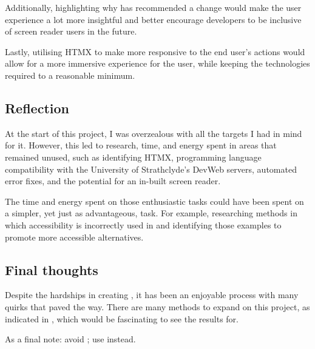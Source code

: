 Additionally, highlighting why \lintexspaced has recommended a change would make the user experience a lot more insightful and better encourage developers to be inclusive of screen reader users in the future.

Lastly, utilising HTMX to make \lintexspaced more responsive to the end user's actions would allow for a more immersive experience for the user, while keeping the technologies required to a reasonable minimum.

\subsection{Reflection}
At the start of this project, I was overzealous with all the targets I had in mind for it. However, this led to research, time, and energy spent in areas that remained unused, such as identifying HTMX, programming language compatibility with the University of Strathclyde's DevWeb servers, automated error fixes, and the potential for an in-built screen reader.

The time and energy spent on those enthusiastic tasks could have been spent on a simpler, yet just as advantageous, task. For example, researching methods in which accessibility is incorrectly used in \pdflatexspaced and identifying those examples to promote more accessible alternatives.

\subsection{Final thoughts}
Despite the hardships in creating \lintex , it has been an enjoyable process with many quirks that paved the way. There are many methods to expand on this project, as indicated in , which would be fascinating to see the results for.

As a final note: avoid \pdflatex; use \lualatexspaced instead.